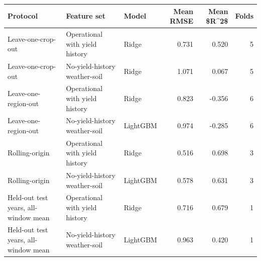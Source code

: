 \begin{tabular}{lllrrr}
\toprule
Protocol & Feature set & Model & Mean RMSE & Mean \$R\textasciicircum{}2\$ & Folds \\
\midrule
Leave-one-crop-out & Operational with yield history & Ridge & 0.731 & 0.520 & 5 \\
Leave-one-crop-out & No-yield-history weather-soil & Ridge & 1.071 & 0.067 & 5 \\
Leave-one-region-out & Operational with yield history & Ridge & 0.823 & -0.356 & 6 \\
Leave-one-region-out & No-yield-history weather-soil & LightGBM & 0.974 & -0.285 & 6 \\
Rolling-origin & Operational with yield history & Ridge & 0.516 & 0.698 & 3 \\
Rolling-origin & No-yield-history weather-soil & LightGBM & 0.578 & 0.631 & 3 \\
Held-out test years, all-window mean & Operational with yield history & Ridge & 0.716 & 0.679 & 1 \\
Held-out test years, all-window mean & No-yield-history weather-soil & LightGBM & 0.963 & 0.420 & 1 \\
\bottomrule
\end{tabular}

